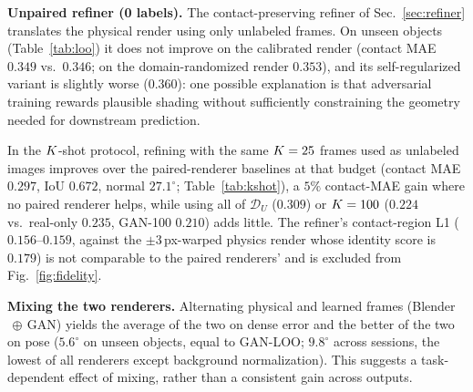 \noindent\textbf{Unpaired refiner (0 labels).} The contact-preserving refiner of Sec.~\ref{sec:refiner} translates the physical render using only unlabeled frames. On unseen objects (Table~\ref{tab:loo}) it does not improve on the calibrated render (contact MAE $0.349$ vs.\ $0.346$; on the domain-randomized render $0.353$), and its self-regularized variant is slightly worse ($0.360$): one possible explanation is that adversarial training rewards plausible shading without sufficiently constraining the geometry needed for downstream prediction.

In the $K$-shot protocol, refining with the same $K=25$ frames used as unlabeled images improves over the paired-renderer baselines at that budget (contact MAE $0.297$, IoU $0.672$, normal $27.1^\circ$; Table~\ref{tab:kshot}), a $5\%$ contact-MAE gain where no paired renderer helps, while using all of $\mathcal{D}_U$ ($0.309$) or $K=100$ ($0.224$ vs.\ real-only $0.235$, GAN-100 $0.210$) adds little. The refiner's contact-region L1 ($0.156$--$0.159$, against the $\pm3\,$px-warped physics render whose identity score is $0.179$) is not comparable to the paired renderers' and is excluded from Fig.~\ref{fig:fidelity}.

\noindent\textbf{Mixing the two renderers.} Alternating physical and learned frames (Blender$\,\oplus\,$GAN) yields the average of the two on dense error and the better of the two on pose ($5.6^\circ$ on unseen objects, equal to GAN-LOO; $9.8^\circ$ across sessions, the lowest of all renderers except background normalization). This suggests a task-dependent effect of mixing, rather than a consistent gain across outputs.
